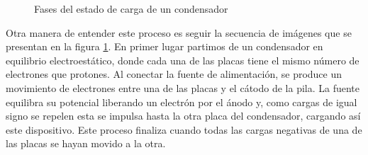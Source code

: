 \documentclass[../main.tex]{subfiles}
\begin{document}
 \begin{figure}[!h]
    \centering
    \caption{Fases del estado de carga de un condensador}
    \label{fig::carga_condensador}
\end{figure}

Otra manera de entender este proceso es seguir la secuencia de imágenes que se presentan en la figura \ref{fig::carga_condensador}. En primer lugar partimos de un condensador en equilibrio electroestático, donde cada una de las placas tiene el mismo número de electrones que protones. Al conectar la fuente de alimentación, se produce un movimiento de electrones entre una de las placas y el cátodo de la pila. La fuente equilibra su potencial liberando un electrón por el ánodo y, como cargas de igual signo se repelen esta se impulsa hasta la otra placa del condensador, cargando así este dispositivo. Este proceso finaliza cuando todas las cargas negativas de una de las placas se hayan movido a la otra. \\
\end{document}
